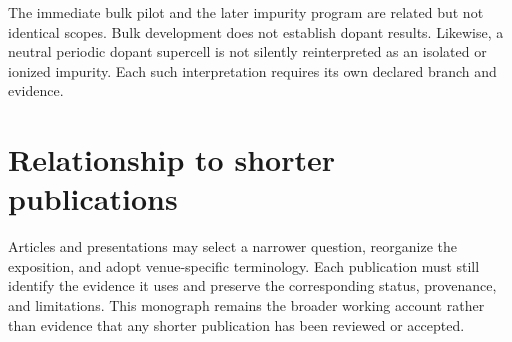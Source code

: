 The immediate bulk pilot and the later impurity program are related but not
identical scopes. Bulk development does not establish dopant results. Likewise,
a neutral periodic dopant supercell is not silently reinterpreted as an isolated
or ionized impurity. Each such interpretation requires its own declared branch
and evidence.


\section*{Relationship to shorter publications}

Articles and presentations may select a narrower question, reorganize the
exposition, and adopt venue-specific terminology. Each publication must still
identify the evidence it uses and preserve the corresponding status,
provenance, and limitations. This monograph remains the broader working account
rather than evidence that any shorter publication has been reviewed or
accepted.

